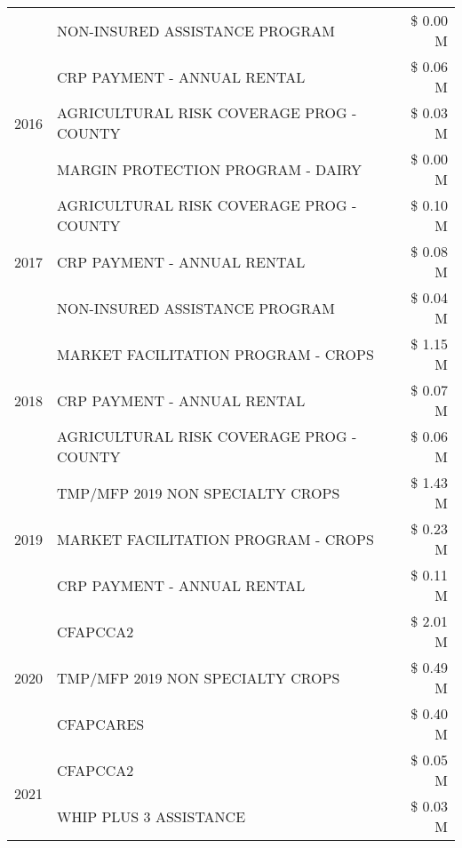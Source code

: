 \begin{tabular}{llr}
 & NON-INSURED ASSISTANCE PROGRAM & \$ 0.00 M \\
\cline{1-3}
\multirow[t]{3}{*}{2016} & CRP PAYMENT - ANNUAL RENTAL & \$ 0.06 M \\
 & AGRICULTURAL RISK COVERAGE PROG - COUNTY & \$ 0.03 M \\
 & MARGIN PROTECTION PROGRAM - DAIRY & \$ 0.00 M \\
\cline{1-3}
\multirow[t]{3}{*}{2017} & AGRICULTURAL RISK COVERAGE PROG - COUNTY & \$ 0.10 M \\
 & CRP PAYMENT - ANNUAL RENTAL & \$ 0.08 M \\
 & NON-INSURED ASSISTANCE PROGRAM & \$ 0.04 M \\
\cline{1-3}
\multirow[t]{3}{*}{2018} & MARKET FACILITATION PROGRAM - CROPS & \$ 1.15 M \\
 & CRP PAYMENT - ANNUAL RENTAL & \$ 0.07 M \\
 & AGRICULTURAL RISK COVERAGE PROG - COUNTY & \$ 0.06 M \\
\cline{1-3}
\multirow[t]{3}{*}{2019} & TMP/MFP 2019 NON SPECIALTY CROPS & \$ 1.43 M \\
 & MARKET FACILITATION PROGRAM - CROPS & \$ 0.23 M \\
 & CRP PAYMENT - ANNUAL RENTAL & \$ 0.11 M \\
\cline{1-3}
\multirow[t]{3}{*}{2020} & CFAPCCA2 & \$ 2.01 M \\
 & TMP/MFP 2019 NON SPECIALTY CROPS & \$ 0.49 M \\
 & CFAPCARES & \$ 0.40 M \\
\cline{1-3}
\multirow[t]{2}{*}{2021} & CFAPCCA2 & \$ 0.05 M \\
 & WHIP PLUS 3 ASSISTANCE & \$ 0.03 M \\
\cline{1-3}
\bottomrule
\end{tabular}
